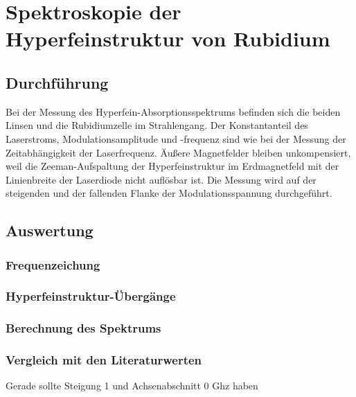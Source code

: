 \section{Spektroskopie der Hyperfeinstruktur von Rubidium}
\subsection{Durchführung}
Bei der Messung des Hyperfein-Absorptionsspektrums befinden sich die beiden Linsen und
die Rubidiumzelle im Strahlengang.
Der Konstantanteil des Laserstroms, Modulationsamplitude und -frequenz
sind wie bei der Messung der Zeitabhängigkeit der Laserfrequenz.
Äußere Magnetfelder bleiben unkompensiert, weil die Zeeman-Aufspaltung der Hyperfeinstruktur im Erdmagnetfeld
mit der Linienbreite der Laserdiode nicht auflösbar ist.
Die Messung wird auf der steigenden und der fallenden Flanke der Modulationsspannung durchgeführt.


\subsection{Auswertung}
\subsubsection*{Frequenzeichung}
\subsubsection*{Hyperfeinstruktur-Übergänge}
\subsubsection*{Berechnung des Spektrums}
\subsubsection*{Vergleich mit den Literaturwerten}
Gerade sollte Steigung 1 und Achsenabschnitt 0 Ghz haben
